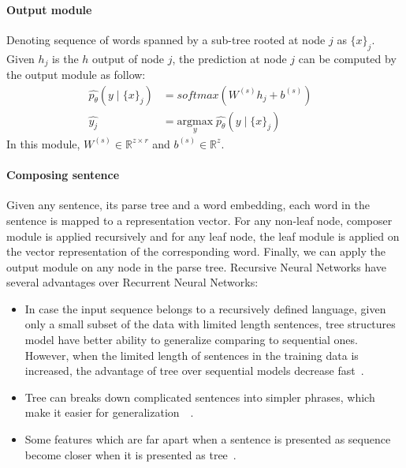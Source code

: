 \paragraph{Output module}
Denoting sequence of words spanned by a sub-tree rooted at node \({j}\) as \({\{x\}_j}\).
Given \({h_j}\) is the \({h}\) output of node \({j}\), the prediction at node \({j}\) can be computed by the output module as follow:
\begin{align}
\hat{p_{\theta}}(y \mid \{x\}_j ) &= softmax( W^{(s)} h_j + b^{(s)}) & \\
\hat{y_j} &= \underset{y}{\mathrm{argmax}} \; \hat{p_{\theta}}(y \mid \{x\}_j ) &
\end{align}
In this module, \(W^{(s)} \in \mathbb{R}^{z \times r}\) and \( b^{(s)} \in \mathbb{R}^z\).
\paragraph{Composing sentence}
Given any sentence, its parse tree and a word embedding, each word in the sentence is mapped to a representation vector.
For any non-leaf node, composer module is applied recursively and for any leaf node, the leaf module is applied on the vector representation of the corresponding word.
Finally, we can apply the output module on any node in the parse tree.
Recursive Neural Networks have several advantages over Recurrent Neural Networks: 
\begin{itemize}
	\item In case the input sequence belongs to a recursively defined language, given only a small subset of the data with limited length sentences, tree structures model have better ability to generalize comparing to sequential ones.
	However, when the limited length of sentences in the training data is increased, the advantage of tree over sequential models decrease fast~\cite{bowman-treevslstm}. 
	\item Tree can breaks down complicated sentences into simpler phrases, which make it easier for generalization~\cite{knowledge-matter}~\cite{need-tree}.
	\item Some features which are far apart when a sentence is presented as sequence become closer when it is presented as tree~\cite{need-tree}.
\end{itemize}